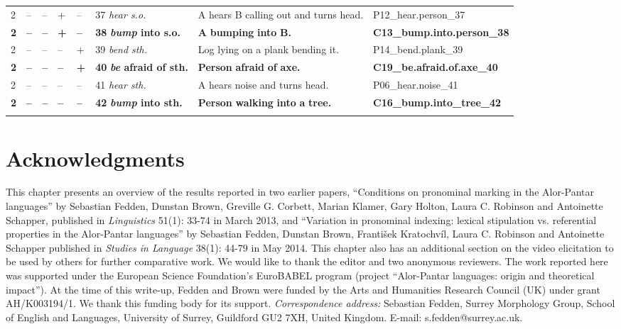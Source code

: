\begin{tabularx}{\textwidth}{llllllQl}
2 		& -- 	& -- 		& + 		& -- 		& 37 		\textit{hear s.o.}& A hears B calling out and turns head. 			& P12\_hear.person\_37  \\
\textbf{2} 	& \textbf{--}& \textbf{--}& \textbf{+} 	& \textbf{--} 	& \textbf{38} 	\textbf{\textit{bump} \textbf{into} \textbf{s.o.}} &\textbf{A} \textbf{bumping} \textbf{into} \textbf{B.} & \textbf{C13\_bump.into.person\_38} \\
2 		& -- 	& -- 		& -- 		& + 		& 39 		\textit{bend sth.} &Log lying on a plank bending it.				&  P14\_bend.plank\_39  \\
\textbf{2} 	& \textbf{--}& \textbf{--}& \textbf{--}& \textbf{+} & \textbf{40} \textbf{\textit{be} \textbf{afraid} \textbf{of} \textbf{sth.}}	& \textbf{Person} \textbf{afraid} \textbf{of} \textbf{axe.}&  \textbf{C19\_be.afraid.of.axe\_40}  \\
2 		& -- 	& -- 		& -- 		& -- 		& 41 		\textit{hear sth.} &A hears noise and turns head. & P06\_hear.noise\_41 \\
\textbf{2} 	& \textbf{--}& \textbf{--}& \textbf{--}& \textbf{--} 	& \textbf{42} 	\textbf{\textit{bump} \textbf{into} \textbf{sth.}} &\textbf{Person} \textbf{walking} \textbf{into} \textbf{a} \textbf{tree.} & \textbf{C16\_bump.into\_tree\_42} \\
\lspbottomrule
\end{tabularx}
\normalsize

\section*{Acknowledgments}
This chapter presents an overview of the results reported in two earlier papers, ``Conditions on pronominal marking in the Alor-Pantar languages'' by Sebastian Fedden, Dunstan Brown, Greville G. Corbett, Marian Klamer, Gary Holton, Laura C. Robinson and Antoinette Schapper, published in \textit{Linguistics} 51(1): 33-74 in March 2013, and ``Variation in pronominal indexing: lexical stipulation vs. referential properties in the Alor-Pantar languages'' by Sebastian Fedden, Dunstan Brown, Franti\v{s}ek Kratochv\'il, Laura C. Robinson and Antoinette Schapper published in \textit{Studies in Language} 38(1): 44-79 in May 2014. This chapter also has an additional section on the video elicitation to be used by others for further comparative work. We would like to thank the editor and two anonymous reviewers. The work reported here was supported under the European Science Foundation's EuroBABEL program (project ``Alor-Pantar languages: origin and theoretical impact''). At the time of this write-up, Fedden and Brown were funded by the Arts and Humanities Research Council (UK) under grant AH/K003194/1. We thank this funding body for its support. \textit{Correspondence address:} Sebastian Fedden, Surrey Morphology Group, School of English and Languages, University of Surrey, Guildford GU2 7XH, United Kingdom. E-mail: s.fedden@surrey.ac.uk.

